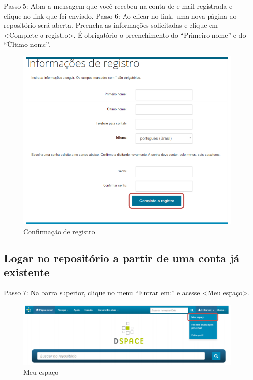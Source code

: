 \documentclass[12pt,hidelinks]{article}
\begin{document}
        Passo 5: Abra a mensagem que você recebeu na conta de e-mail registrada e clique no link que foi enviado.
        \singlespacing
        Passo 6: Ao clicar no link, uma nova página do repositório será aberta. Preencha as informações solicitadas e clique em <Complete o registro>. É obrigatório o preenchimento do “Primeiro nome” e do “Último nome”. 
        
        \begin{figure}[!htp]
                \centering
                \includegraphics[scale=0.5]{figura/Figura6.png}
                \caption{Confirmação de registro}
            \label{Rotulo}
        \end{figure}
        
\newpage
        \subsection{Logar no repositório a partir de uma conta já existente}
        
        Passo 7: Na barra superior, clique no menu “Entrar em:” e acesse <Meu espaço>.
        
        \begin{figure}[!htp]
                \centering
                \includegraphics[scale=0.6]{figura/Figura7.png}
                \caption{Meu espaço}
            \label{Rotulo}
        \end{figure}
        
\end{document}
